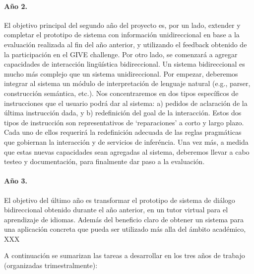 \paragraph{A\~no 2.} El objetivo principal del segundo a\~no del proyecto es,
por un lado, extender y completar el prototipo de sistema con informaci\'on
unidireccional en base a la evaluaci\'on realizada al fin del a\~no anterior,
y utilizando el feedback obtenido de la
participaci\'on en el GIVE challenge.  Por otro lado, se comenzar\'a a agregar
capacidades de interacci\'on ling\"u\'istica bidireccional.  Un sistema
bidireccional es mucho m\'as complejo que un sistema unidireccional.  Por
empezar, deberemos integrar al sistema un m\'odulo de interpretaci\'on de
lenguaje natural (e.g., parser, construcci\'on sem\'antica, etc.).  Nos
concentraremos en dos tipos espec\'ificos de instrucciones que el usuario
podr\'a dar al sistema: a) pedidos de aclaraci\'on de la \'ultima
instrucci\'on dada, y b) redefinici\'on del goal de la interacci\'on.  Estos
dos tipos de instrucci\'on son representativos de `reparaciones' a corto y
largo plazo.  Cada uno de ellos requerir\'a la redefinici\'on adecuada de
las reglas pragm\'aticas que gobiernan la interacci\'on y de servicios
de infer\'encia.  Una vez m\'as, a medida que
estas nuevas capacidades sean agregadas al sistema, deberemos llevar a
cabo testeo y documentaci\'on, para finalmente dar paso a la evaluaci\'on.



\paragraph{A\~no 3.} El objetivo del \'ultimo a\~no es transformar el prototipo
de sistema de di\'alogo bidireccional obtenido durante el a\~no anterior, en un
tutor virtual para el aprendizaje de idiomas.  Adem\'as del beneficio claro de
obtener un sistema para una aplicaci\'on concreta que pueda ser utilizado
m\'as alla del \'ambito acad\'emico, XXX 

\medskip

\noindent
A continuaci\'on se sumarizan las tareas a desarrollar en los tres a\~nos de
trabajo (organizadas trimestralmente):

